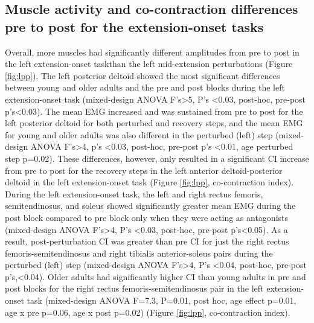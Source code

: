 \documentclass[../thesis_seyed.tex]{subfiles}
\begin{document}
\subsection{Muscle activity and co-contraction differences pre to post for the extension-onset tasks}
Overall, more muscles had significantly different amplitudes from pre to post in the left extension-onset taskthan the left mid-extension perturbations (Figure \ref{fig:lpp}). The left posterior deltoid showed the most significant  differences between young and older adults and the pre and post blocks during the left extension-onset task (mixed-design ANOVA F's>5, P's <0.03, post-hoc, pre-post p's<0.03). The mean EMG increased and was sustained from pre to post for the left posterior deltoid for both perturbed and recovery steps, and the mean EMG for young and older adults was also different in the perturbed (left) step (mixed-design ANOVA F's>4, p's <0.03, post-hoc, pre-post p's <0.01, age perturbed step p=0.02). These differences, however, only resulted in a significant CI increase from pre to post for the recovery steps in the left anterior deltoid-posterior deltoid in the left extension-onset task (Figure \ref{fig:lpp}, co-contraction index). During the left extension-onset task, the left and right rectus femoris, semitendinosus, and soleus showed significantly greater mean EMG during the post block compared to pre block only when they were acting as antagonists (mixed-design ANOVA F's>4, P's <0.03, post-hoc, pre-post p's<0.05). As a result, post-perturbation CI was greater than pre CI for just the right rectus femoris-semitendinosus and right tibialis anterior-soleus pairs during the perturbed (left) step (mixed-design ANOVA F's>4, P's <0.04, post-hoc, pre-post p's,<0.04). Older adults had significantly higher CI than young adults in pre and post blocks for the right rectus femoris-semitendinosus pair in the left extension-onset task (mixed-design ANOVA F=7.3, P=0.01, post hoc, age effect p=0.01, age x pre p=0.06, age x post p=0.02) (Figure \ref{fig:lpp}, co-contraction index).
\end{document}
